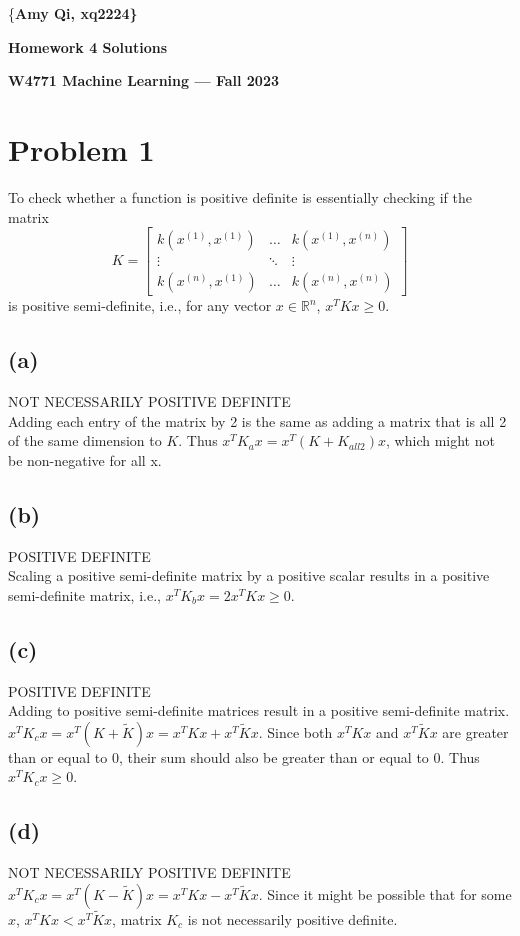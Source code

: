 \documentclass[11pt]{article}
\begin{document}
\centerline{\{\bf Amy Qi, xq2224\}}
\centerline{\bf Homework 4 Solutions}
\centerline{\bf W4771 Machine Learning --- Fall 2023}

\bigskip 
\bigskip

\section*{Problem 1}
To check whether a function is positive definite is essentially checking if the matrix
\[ K = 
\begin{bmatrix}
    k(x^{(1)}, x^{(1)}) & \ldots & k(x^{(1)}, x^{(n)})\\
    \vdots & \ddots & \vdots \\
    k(x^{(n)}, x^{(1)}) & \ldots & k(x^{(n)}, x^{(n)})
\end{bmatrix}
\]
is positive semi-definite, i.e., for any vector $x \in \mathbb{R}^n$, $x^T K x \geq 0$.

\subsection*{(a)}
NOT NECESSARILY POSITIVE DEFINITE \\
Adding each entry of the matrix by 2 is the same as adding a matrix that is all 2 of the same dimension to $K$. Thus $x^T K_a x = x^T (K + K_{all 2}) x $, which might not be non-negative for all x.

\subsection*{(b)}
POSITIVE DEFINITE \\
Scaling a positive semi-definite matrix by a positive scalar results in a positive semi-definite matrix, i.e., $x^T K_b x = 2x^T K x \geq 0$.

\subsection*{(c)}
POSITIVE DEFINITE \\
Adding to positive semi-definite matrices result in a positive semi-definite matrix. $x^T K_c x = x^T (K+\widetilde{K}) x = x^T K x + x^T \widetilde{K} x$. Since both $x^T K x$ and $x^T \widetilde{K} x$ are greater than or equal to 0, their sum should also be greater than or equal to 0. Thus $x^T K_c x \geq 0$.

\subsection*{(d)}
NOT NECESSARILY POSITIVE DEFINITE \\
$x^T K_c x = x^T (K-\widetilde{K}) x = x^T K x - x^T \widetilde{K} x$. Since it might be possible that for some $x$, $x^T K x < x^T \widetilde{K} x$, matrix $K_c$ is not necessarily positive definite.
\end{document}
